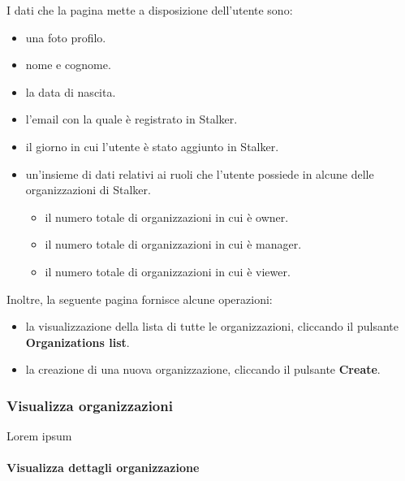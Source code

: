 \documentclass[../manuale-utente.tex]{subfiles}
\begin{document}
I dati che la pagina mette a disposizione dell'utente sono:
\begin{itemize}
    \item una foto profilo.
    \item nome e cognome.
    \item la data di nascita.
    \item l'email con la quale è registrato in Stalker.
    \item il giorno in cui l'utente è stato aggiunto in Stalker.
    \item un'insieme di dati relativi ai ruoli che l'utente possiede in alcune delle organizzazioni di Stalker.
    \begin{itemize}
        \item il numero totale di organizzazioni in cui è owner.
        \item il numero totale di organizzazioni in cui è manager.
        \item il numero totale di organizzazioni in cui è viewer.
    \end{itemize}
\end{itemize}

Inoltre, la seguente pagina fornisce alcune operazioni:
\begin{itemize}
    \item la visualizzazione della lista di tutte le organizzazioni, cliccando il pulsante \textbf{Organizations list}. %
    \item la creazione di una nuova organizzazione, cliccando il pulsante \textbf{Create}. %
\end{itemize}
\newpage

\subsubsection{Visualizza organizzazioni}%
\label{subs:visualizza_organizzazioni}


Lorem ipsum
\newpage

\paragraph{Visualizza dettagli organizzazione}%
\label{par:visualizza_dettagli_organizzazione}
\end{document}
